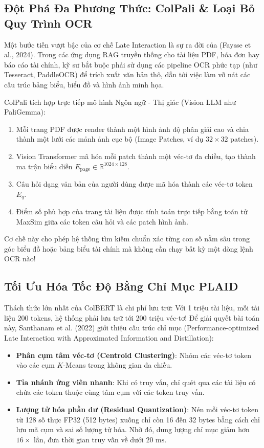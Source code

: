 \subsection{Đột Phá Đa Phương Thức: ColPali \& Loại Bỏ Quy Trình OCR}
Một bước tiến vượt bậc của cơ chế Late Interaction là sự ra đời của  (Faysse et al., 2024). Trong các ứng dụng RAG truyền thống cho tài liệu PDF, hóa đơn hay báo cáo tài chính, kỹ sư bắt buộc phải sử dụng các pipeline OCR phức tạp (như Tesseract, PaddleOCR) để trích xuất văn bản thô, dẫn tới việc làm vỡ nát các cấu trúc bảng biểu, biểu đồ và hình ảnh minh họa.

ColPali tích hợp trực tiếp mô hình Ngôn ngữ - Thị giác (Vision LLM như PaliGemma):
\begin{enumerate}
  \item Mỗi trang PDF được render thành một hình ảnh độ phân giải cao và chia thành một lưới các mảnh ảnh cục bộ (Image Patches, ví dụ $32 \times 32$ patches).
  \item Vision Transformer mã hóa mỗi patch thành một véc-tơ đa chiều, tạo thành ma trận biểu diễn $E_{\text{page}} \in \mathbb{R}^{1024 \times 128}$.
  \item Câu hỏi dạng văn bản của người dùng được mã hóa thành các véc-tơ token $E_q$.
  \item Điểm số phù hợp của trang tài liệu được tính toán trực tiếp bằng toán tử MaxSim giữa các token câu hỏi và các patch hình ảnh.
\end{enumerate}
Cơ chế này cho phép hệ thống tìm kiếm chuẩn xác từng con số nằm sâu trong góc biểu đồ hoặc bảng biểu tài chính mà không cần chạy bất kỳ một dòng lệnh OCR nào!

\subsection{Tối Ưu Hóa Tốc Độ Bằng Chỉ Mục PLAID}
Thách thức lớn nhất của ColBERT là chi phí lưu trữ: Với 1 triệu tài liệu, mỗi tài liệu 200 tokens, hệ thống phải lưu trữ tới 200 triệu véc-tơ! Để giải quyết bài toán này, Santhanam et al. (2022) giới thiệu cấu trúc chỉ mục  (Performance-optimized Late Interaction with Approximated Information and Distillation):
\begin{itemize}
  \item \textbf{Phân cụm tâm véc-tơ (Centroid Clustering)}: Nhóm các véc-tơ token vào các cụm $K$-Means trong không gian đa chiều.
  \item \textbf{Tỉa nhánh ứng viên nhanh}: Khi có truy vấn, chỉ quét qua các tài liệu có chứa các token thuộc cùng tâm cụm với các token truy vấn.
  \item \textbf{Lượng tử hóa phần dư (Residual Quantization)}: Nén mỗi véc-tơ token từ 128 số thực FP32 (512 bytes) xuống chỉ còn 16 đến 32 bytes bằng cách chỉ lưu mã cụm và sai số lượng tử hóa. Nhờ đó, dung lượng chỉ mục giảm hơn $16\times$ lần, đưa thời gian truy vấn về dưới $20\text{ ms}$.
\end{itemize}

